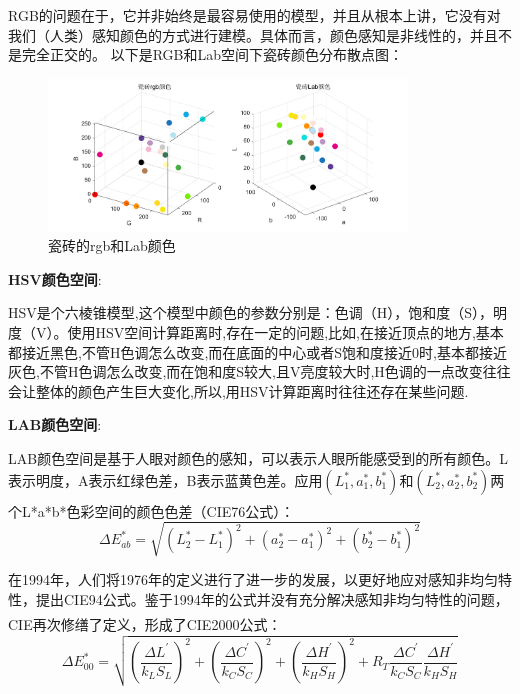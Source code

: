 \documentclass{article}
\newcommand{\upcite}[1]{\textsuperscript{\textsuperscript{\cite{#1}}}}
\begin{document}
 RGB的问题在于，它并非始终是最容易使用的模型，并且从根本上讲，它没有对我们（人类）感知颜色的方式进行建模。具体而言，颜色感知是非线性的，并且不是完全正交的。
 以下是RGB和Lab空间下瓷砖颜色分布散点图：
 \begin{figure}[H]
 	\centering
 	\includegraphics[width=0.85\textwidth]{img/瓷砖的rgb和Lab颜色.png}
 	\caption{瓷砖的rgb和Lab颜色}
 	\label{瓷砖的rgb和Lab颜色}
 \end{figure}
 \textbf{HSV颜色空间}:
 
 HSV是个六棱锥模型,这个模型中颜色的参数分别是：色调（H），饱和度（S），明度（V）。使用HSV空间计算距离时,存在一定的问题,比如,在接近顶点的地方,基本都接近黑色,不管H色调怎么改变,而在底面的中心或者S饱和度接近0时,基本都接近灰色,不管H色调怎么改变,而在饱和度S较大,且V亮度较大时,H色调的一点改变往往会让整体的颜色产生巨大变化,所以,用HSV计算距离时往往还存在某些问题.
 
  \textbf{LAB颜色空间}:
 
 LAB颜色空间是基于人眼对颜色的感知，可以表示人眼所能感受到的所有颜色。L表示明度，A表示红绿色差，B表示蓝黄色差。应用$\left(L_{1}^{*}, a_{1}^{*}, b_{1}^{*}\right)$和$\left(L_{2}^{*}, a_{2}^{*}, b_{2}^{*}\right)$两个L*a*b*色彩空间的颜色色差（CIE76公式\upcite{YanSeChaiYi2021}）：
 \begin{equation}
 \Delta E_{a b}^{*}=\sqrt{\left(L_{2}^{*}-L_{1}^{*}\right)^{2}+\left(a_{2}^{*}-a_{1}^{*}\right)^{2}+\left(b_{2}^{*}-b_{1}^{*}\right)^{2}}
 \label{cie76}
 \end{equation}
 
 在1994年，人们将1976年的定义进行了进一步的发展，以更好地应对感知非均匀特性，提出CIE94公式。鉴于1994年的公式并没有充分解决感知非均匀特性的问题，CIE再次修缮了定义，形成了CIE2000公式\upcite{YanSeChaiYi2021}：
 \begin{equation}
 \Delta E_{00}^{*}=\sqrt{\left(\frac{\Delta L^{\prime}}{k_{L} S_{L}}\right)^{2}+\left(\frac{\Delta C^{\prime}}{k_{C} S_{C}}\right)^{2}+\left(\frac{\Delta H^{\prime}}{k_{H} S_{H}}\right)^{2}+R_{T} \frac{\Delta C^{\prime}}{k_{C} S_{C}} \frac{\Delta H^{\prime}}{k_{H} S_{H}}}
 \label{cie2000}
 \end{equation}
 
\end{document}

